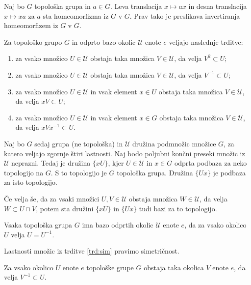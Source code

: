 \documentclass[mat1]{fmfdelo}
\newcommand{\Ucurl}{\mathcal{U}}
\begin{document}
\begin{trditev}\label{trd:trans}
Naj bo $G$ topološka grupa in $a \in G$. Leva translacija $x \mapsto ax$ in desna translacija $x \mapsto xa$ za $a$ sta homeomorfizma iz $G$ v $G$. Prav tako je preslikava invertiranja homeomorfizem iz $G$ v $G$.
\end{trditev}

\begin{trditev}\label{trd:okolice}
Za topološko grupo $G$ in odprto bazo okolic $\Ucurl$ enote $e$ veljajo naslednje trditve:
\begin{enumerate}
\item za vsako množico $U \in \Ucurl$ obstaja taka množica $V \in \Ucurl$, da velja $V^{2} \subset U$;
\item za vsako množico $U \in \Ucurl$ obstaja taka množica $V \in \Ucurl$, da velja $V^{-1} \subset U$;
\item za vsako množico $U \in \Ucurl$ in vsak element $x \in U$ obstaja taka množica $V \in \Ucurl$, da velja $xV \subset U$;
\item za vsako množico $U \in \Ucurl$ in vsak element $x \in G$ obstaja taka množica $V \in \Ucurl$, da velja $xVx^{-1} \subset U$.
\end{enumerate}

Naj bo $G$ sedaj grupa (ne topološka) in $\Ucurl$ družina podmnožic množice $G$, za katero veljajo zgornje štiri lastnosti. Naj bodo poljubni končni preseki množic iz $\Ucurl$ neprazni. Tedaj je družina $\lbrace xU \rbrace$, kjer $U \in \Ucurl$ in $x \in G$ odprta podbaza za neko topologijo na $G$. S to topologijo je $G$ topološka grupa. Družina $\lbrace Ux \rbrace$ je podbaza za isto topologijo.

Če velja še, da za vsaki množici $U,V \in \Ucurl$ obstaja množica $W \in \Ucurl$, da velja $W \subset U \cap V$, potem sta družini $\lbrace xU \rbrace$ in $\lbrace Ux \rbrace$ tudi bazi za to topologijo.
\end{trditev}

\begin{trditev}\label{trd:sim}
Vsaka topološka grupa $G$ ima bazo odprtih okolic $\Ucurl$ enote $e$, da za vsako okolico $U$ velja $U = U^{-1}$.
\end{trditev}

\begin{opomba}
Lastnosti množic iz trditve \ref{trd:sim} pravimo simetričnost.
\end{opomba}

\begin{posledica}\label{pos:sim}
Za vsako okolico $U$ enote $e$ topološke grupe $G$ obstaja taka okolica $V$ enote $e$, da velja $V^{-1} \subset U$.
\end{posledica}
\end{document}
